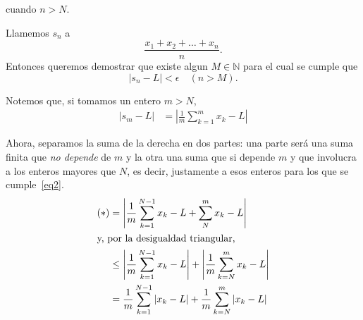 \documentclass[fleqn,leqno,11pt,letterpaper,final]{article}
\begin{document}
cuando $n>N$.

Llamemos $s_n$ a  
\[
	 \frac{x_1+x_2+\dots+x_n}{n} .
\]
Entonces queremos demostrar que existe algun $M\in\mathbb{N}$ para el cual se cumple que
\[
	\left\lvert s_n-L \right\rvert<\epsilon\quad (n>M).
\]

Notemos que, si tomamos un entero $m>N$,
\begin{align*}
	\left\lvert s_m-L \right\rvert 
		&= \left\lvert \frac{1}{m} \sum^{m}_{k=1} x_k - L\right\rvert\tag{$\ast$}
\end{align*}

Ahora, separamos la suma de la derecha en dos partes: una parte será una suma 
finita que \emph{no depende} de
$m$ y la otra una suma que si depende $m$ y que involucra a los enteros mayores que $N$, es
decir, justamente a esos enteros para los que se cumple~\ref{eq2}.
\begin{align*}
	(\ast) &= \left\lvert \frac{1}{m} \sum^{N-1}_{k=1} x_k-L + \sum^{m}_{N} x_k-L  \right\rvert\\	
	\shortintertext{y, por la desigualdad triangular,}
	       &\leq \left\lvert \frac{1}{m} \sum^{N-1}_{k=1} x_k-L \right\rvert + \left\lvert \frac{1}{m} \sum^{m}_{k=N} x_k-L \right\rvert\\
	       &= \frac{1}{m} \sum_{k=1}^{N-1} \left\lvert x_k-L \right\rvert + \frac{1}{m} \sum_{k=N}^{m} \left\lvert x_k-L \right\rvert
\end{align*}
\end{document}
